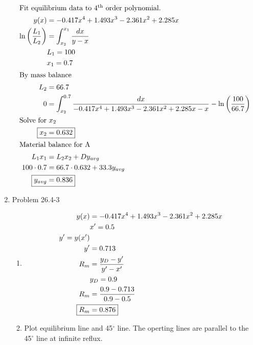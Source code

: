 \documentclass[12pt]{article}
\begin{document}
\begin{enumerate}
    \begin{align*}
        \intertext{Fit equilibrium data to 4$^{\text{th}}$ order polynomial.}
        y(x) &= -0.417 x^4 + 1.493 x^3 - 2.361 x^2 + 2.285 x \\
        \ln \left(\frac{L_1}{L_2}\right) &= \int_{x_2}^{x_1} \frac{dx}{y-x} \\
        & L_1 = 100 \\
        & x_1 = 0.7 \\
        \intertext{By mass balance}
        L_2 &= 66.7 \\
        0 &= \int_{x_2}^{0.7} \frac{dx}{-0.417 x^4 + 1.493 x^3 - 2.361 x^2 + 2.285 x - x} - \ln \left(\frac{100}{66.7}\right) \\
        \intertext{Solve for $x_2$}
        \Aboxed{x_2 &= 0.632} \\
        \intertext{Material balance for A}
        L_1 x_1 &= L_2 x_2 + D y_{avg} \\
        100 \cdot 0.7 &= 66.7 \cdot 0.632 + 33.3 y_{avg} \\
        \Aboxed{y_{avg} &= 0.836}
    \end{align*}

\newpage
    \item Problem 26.4-3
    
    \begin{enumerate}
        \item 
        \begin{align*}
            y(x) &= -0.417 x^4 + 1.493 x^3 - 2.361 x^2 + 2.285 x \\
            & x' = 0.5 \\
            y' = y(x') \\
            y' &= 0.713 \\
            R_m &= \frac{y_D - y'}{y' - x'} \\
            & y_D = 0.9 \\
            R_m &= \frac{0.9 - 0.713}{0.9 - 0.5} \\
            \Aboxed{R_m &= 0.876}
        \end{align*}

        \item 
        
        Plot equilibrium line and 45$^\circ$ line. The operting lines are parallel to the 45$^\circ$ line at infinite reflux. 


\end{enumerate}
\end{enumerate}
\end{document}
